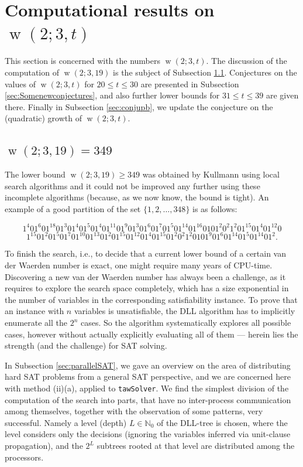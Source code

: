 \documentclass[final,3p,times]{elsarticle}
\theoremstyle{definition}
\newcommand{\set}[1]{\{#1\}}
\renewcommand{\leq}{\le} %
\newcommand{\NN}{\mathbb{N}}
\newcommand{\NNZ}{\NN_0}
\newcommand{\tawsolver}{\texttt{tawSolver}}
\DeclareMathOperator{\vdw}{w}
\begin{document}
\section{Computational results on $\vdw(2; 3, t)$}
\label{sec-comp}

This section is concerned with the numbers $\vdw(2; 3, t)$. The discussion of the computation of $\vdw(2; 3, 19)$ is the subject of Subsection \ref{sec:comp349}. Conjectures on the values of $\vdw(2; 3, t)$ for $20 \leq t \leq 30$ are presented in Subsection \ref{sec:Somenewconjectures}, and also further lower bounds for $31 \leq t \leq 39$ are given there. Finally in Subsection \ref{sec:conjupb}, we update the conjecture on the (quadratic) growth of $\vdw(2; 3, t)$.



\subsection{$\vdw(2; 3, 19)=349$}
\label{sec:comp349}

The lower bound $\vdw(2; 3, 19)\geq 349$ was obtained by Kullmann \cite{kullmann0}
using local search algorithms and it could not be improved any further using these incomplete algorithms (because, as we now know, the bound is tight).
An example of a good partition of the set $\set{1,2,\ldots,348}$ is as follows:

\scriptsize
$$1^{4}01^{6}01^{18}01^{3}01^{4}01^{5}01^{4}01^{11}01^{9}01^{3}01^{6}0
1^{7}01^{5}01^{14}01^{16}0101^{2}0^{2}1^{2}01^{15}01^{4}01^{12}0$$
$$1^{15}01^{2}01^{5}01^{7}01^{10}01^{13}01^{2}01^{15}01^{12}01^{4}0
1^{15}01^{2}0^{2}1^{2}0101^{9}01^{6}01^{14}01^{5}01^{14}01^{2}.$$

\normalsize

To finish the search, i.e., to decide that a current lower bound of a certain van der
Waerden number is exact, one might require many years of CPU-time. Discovering a new van der Waerden number has always been a challenge,
as it requires to explore the search space completely, which has a size
exponential in the number of variables in the corresponding satisfiability instance.
To prove that an instance with $n$ variables is unsatisfiable, the DLL algorithm has to implicitly
enumerate all the $2^n$ cases. So the algorithm systematically explores all possible cases, however without actually
explicitly evaluating all of them --- herein lies the strength (and the challenge) for SAT solving.



In Subsection \ref{sec:parallelSAT}, we gave an overview on the area of distributing hard SAT problems from a general SAT perspective, and we are concerned here with method (ii)(a), applied to \tawsolver. We find the simplest division of the computation of the search into parts, that have no inter-process communication among themselves, together with the observation of some patterns, very successful. Namely a level (depth) $L \in \NNZ$ of the DLL-tree is chosen, where the level considers only the decisions (ignoring the variables inferred via unit-clause propagation), and the $2^L$ subtrees rooted at that level are distributed among the processors.
\end{document}

